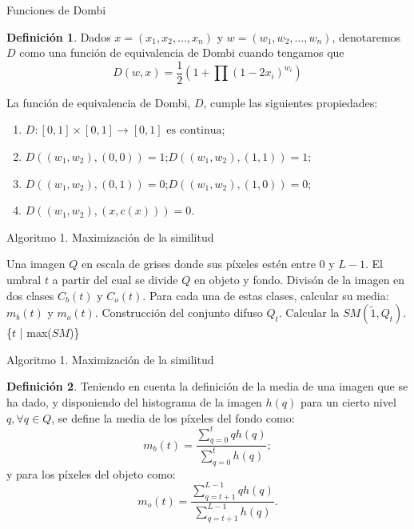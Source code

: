 \documentclass{beamer}
\theoremstyle{plain} %
\theoremstyle{definition}
\newtheorem{defn}{Definición}
\def\unitinterval{[0,1]}
\def\tilda1{\tilde{1}}
\newcommand{\unitspace}{\unitinterval \rightarrow \unitinterval}
\begin{document}
\begin{frame}[squeeze]{Funciones de Dombi}
  \begin{defn}\label{def:dombi}
  Dados $x=(x_1, x_2, \dots,x_n)$ y $w=(w_1,w_2,\dots,w_n)$, denotaremos $D$ como una función de equivalencia de Dombi cuando tengamos que 
  $$D(w,x)=\frac{1}{2}\left(1+\prod(1-2x_{i})^{w_{i}}\right)$$
  \end{defn}
  \begin{block}{}\label{def:propiedadesdombi}
  La función de equivalencia de Dombi, $D$, cumple las siguientes propiedades:
  \begin{enumerate}
    \item $D:\unitinterval\times\unitspace \text{ es continua}$;
    \item $D((w_1,w_2),(0,0)) = 1$;\quad$D((w_1,w_2),(1,1)) = 1$;
    \item $D((w_1,w_2),(0,1)) = 0$;\quad$D((w_1,w_2),(1,0)) = 0$;
    \item $D((w_1,w_2),(x,c(x))) = 0$.
  \end{enumerate}
  \end{block}
\end{frame}

\begin{frame}{Algoritmo 1. Maximización de la similitud}
  \begin{algorithm}[H]%
  \begin{algorithmic}[1]
  \REQUIRE Una imagen $Q$ en escala de grises donde sus píxeles estén entre $0$ y $L-1$.
  \ENSURE El umbral $t$ a partir del cual se divide $Q$ en objeto y fondo.
  \STATE Divisón de la imagen en dos clases $C_b(t)$ y $C_o(t)$. Para cada una de estas clases, calcular su media: $m_b(t)$ y $m_o(t)$.
  \STATE Construcción del conjunto difuso $Q_t$.
  \STATE Calcular la $SM(\tilda1, Q_t)$. \label{lin:alg1:similitud}
  \ENDFOR
  \RETURN \{$t$ | max($SM$)\}
  \end{algorithmic}
  \caption{Maximización de la similitud}\label{alg:algoritmo1}
  \end{algorithm}
\end{frame}

\begin{frame}{Algoritmo 1. Maximización de la similitud}
  \begin{defn}\label{def:mediasmonoumbral}
Teniendo en cuenta la definición de la media de una imagen que se ha dado, y disponiendo del histograma de la imagen $h(q)$ para un cierto nivel $q, \forall q\in Q$, se define la media de los píxeles del fondo como:
$$m_b(t)=\frac{\sum_{q=0}^{t}qh(q)}{\sum_{q=0}^{t}h(q)};$$
y para los píxeles del objeto como:
$$m_o(t)=\frac{\sum_{q=t+1}^{L-1}qh(q)}{\sum_{q=t+1}^{L-1}h(q)}.$$
\end{defn}
\end{frame}
\end{document}

